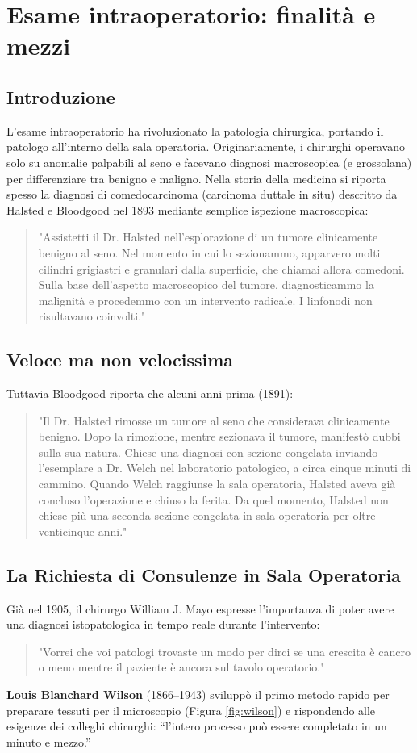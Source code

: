 \chapter{Esame intraoperatorio: finalità e mezzi}


\section{Introduzione}
L'esame intraoperatorio ha rivoluzionato la patologia chirurgica, portando il patologo all'interno della sala operatoria. Originariamente, i chirurghi operavano solo su anomalie palpabili al seno e facevano diagnosi macroscopica (e grossolana) per differenziare tra benigno e maligno. Nella storia della medicina si riporta spesso la diagnosi di comedocarcinoma (carcinoma duttale in situ) descritto da Halsted e Bloodgood nel 1893 mediante semplice ispezione macroscopica:
\begin{quote}
    "Assistetti il Dr. Halsted nell'esplorazione di un tumore clinicamente benigno al seno. Nel momento in cui lo sezionammo, apparvero molti cilindri grigiastri e granulari dalla superficie, che chiamai allora comedoni. Sulla base dell'aspetto macroscopico del tumore, diagnosticammo la malignità e procedemmo con un intervento radicale. I linfonodi non risultavano coinvolti."
\end{quote}

\section{Veloce ma non velocissima}
Tuttavia Bloodgood riporta che alcuni anni prima (1891):
\begin{quote}
    "Il Dr. Halsted rimosse un tumore al seno che considerava clinicamente benigno. Dopo la rimozione, mentre sezionava il tumore, manifestò dubbi sulla sua natura. Chiese una diagnosi con sezione congelata inviando l’esemplare a Dr. Welch nel laboratorio patologico, a circa cinque minuti di cammino. Quando Welch raggiunse la sala operatoria, Halsted aveva già concluso l'operazione e chiuso la ferita. Da quel momento, Halsted non chiese più una seconda sezione congelata in sala operatoria per oltre venticinque anni."
\end{quote}

\section{La Richiesta di Consulenze in Sala Operatoria}
Già nel 1905, il chirurgo William J. Mayo espresse l'importanza di poter avere una diagnosi istopatologica in tempo reale durante l'intervento:
\begin{quote}
    "Vorrei che voi patologi trovaste un modo per dirci se una crescita è cancro o meno mentre il paziente è ancora sul tavolo operatorio."
\end{quote}
\textbf{Louis Blanchard Wilson} (1866–1943) sviluppò il primo metodo rapido per preparare tessuti per il microscopio (Figura \ref{fig:wilson}) e rispondendo alle esigenze dei colleghi chirurghi: ``l'intero processo può essere completato in un minuto e mezzo.''

